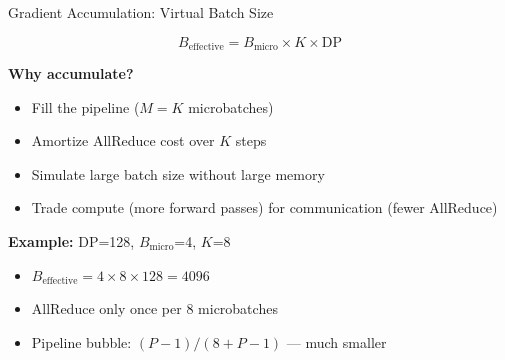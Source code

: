 \documentclass[aspectratio=169, 12pt]{beamer}
\begin{document}
\begin{frame}{Gradient Accumulation: Virtual Batch Size}

\small
\[
  B_{\text{effective}} = B_{\text{micro}} \times K \times \text{DP}
\]

\textbf{Why accumulate?}
\begin{itemize}\setlength\itemsep{2pt}
  \item Fill the pipeline ($M = K$ microbatches)
  \item Amortize AllReduce cost over $K$ steps
  \item Simulate large batch size without large memory
  \item Trade compute (more forward passes) for communication (fewer AllReduce)
\end{itemize}

\vspace{0.2cm}
\textbf{Example:} DP=128, $B_{\text{micro}}$=4, $K$=8
\begin{itemize}
  \item $B_{\text{effective}} = 4 \times 8 \times 128 = 4096$
  \item AllReduce only once per 8 microbatches
  \item Pipeline bubble: $(P-1)/(8+P-1)$ --- much smaller
\end{itemize}
\end{frame}
\end{document}
